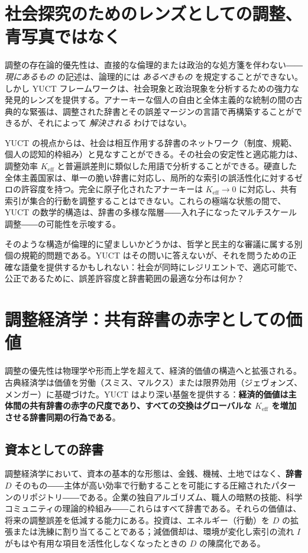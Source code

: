 \documentclass[12pt,a4paper]{article}
\begin{document}
	\section{社会探究のためのレンズとしての調整、青写真ではなく}
	\label{sec:social-lens}
	
	調整の存在論的優先性は、直接的な倫理的または政治的な処方箋を伴わない――\emph{現にあるもの} の記述は、論理的には \emph{あるべきもの} を規定することができない。しかし YUCT フレームワークは、社会現象と政治現象を分析するための強力な発見的レンズを提供する。アナーキーな個人の自由と全体主義的な統制の間の古典的な緊張は、調整された辞書とその誤差マージンの言語で再構築することができるが、それによって \emph{解決される} わけではない。
	
	YUCT の視点からは、社会は相互作用する辞書のネットワーク（制度、規範、個人の認知的枠組み）と見なすことができる。その社会の安定性と適応能力は、調整効率 \(K_{\mathrm{eff}}\) と普遍誤差則に類似した用語で分析することができる。硬直した全体主義国家は、単一の脆い辞書に対応し、局所的な索引の誤活性化に対するゼロの許容度を持つ。完全に原子化されたアナーキーは \(K_{\mathrm{eff}} \to 0\) に対応し、共有索引が集合的行動を調整することはできない。これらの極端な状態の間で、YUCT の数学的構造は、辞書の多様な階層――入れ子になったマルチスケール調整――の可能性を示唆する。
	
	そのような構造が倫理的に望ましいかどうかは、哲学と民主的な審議に属する別個の規範的問題である。YUCT はその問いに答えないが、それを問うための正確な語彙を提供するかもしれない：社会が同時にレジリエントで、適応可能で、公正であるために、誤差許容度と辞書範囲の最適な分布は何か？
	
	\section{調整経済学：共有辞書の赤字としての価値}
	\label{sec:coordination-economics}
	
	調整の優先性は物理学や形而上学を超えて、経済的価値の構造へと拡張される。古典経済学は価値を労働（スミス、マルクス）または限界効用（ジェヴォンズ、メンガー）に基礎づけた。YUCT はより深い基盤を提供する：\textbf{経済的価値は主体間の共有辞書の赤字の尺度であり、すべての交換はグローバルな $K_{\mathrm{eff}}$ を増加させる辞書同期の行為である}。
	
	\subsection{資本としての辞書}
	
	調整経済学において、資本の基本的な形態は、金銭、機械、土地ではなく、\textbf{辞書} $D$ そのもの――主体が高い効率で行動することを可能にする圧縮されたパターンのリポジトリ――である。企業の独自アルゴリズム、職人の暗黙の技能、科学コミュニティの理論的枠組み――これらはすべて辞書である。それらの価値は、将来の調整誤差を低減する能力にある。投資は、エネルギー（行動）を $D$ の拡張または洗練に割り当てることである；減価償却は、環境が変化し索引の流れ $I$ がもはや有用な項目を活性化しなくなったときの $D$ の陳腐化である。
	
\end{document}
